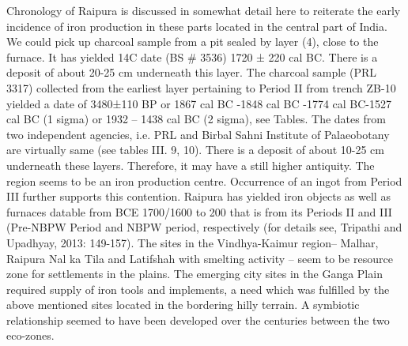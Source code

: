 Chronology of Raipura is discussed in somewhat detail here to reiterate the early incidence of iron production in these parts located in the central part of India. We could pick up charcoal sample from a pit sealed by layer (4), close to the furnace. It has yielded 14C date (BS \# 3536) 1720 ± 220 cal BC. There is a deposit of about 20-25 cm underneath this layer. The charcoal sample (PRL 3317) collected from the earliest layer pertaining to Period II from trench ZB-10 yielded a date of 3480±110 BP or 1867 cal BC -1848 cal BC -1774 cal BC-1527 cal BC (1 sigma) or 1932 – 1438 cal BC (2 sigma), see Tables. The dates from two independent agencies, i.e. PRL and Birbal Sahni Institute of Palaeobotany are virtually same (see tables III. 9, 10). There is a deposit of about 10-25 cm underneath these layers. Therefore, it may have a still higher antiquity. The region seems to be an iron production centre. Occurrence of an ingot from Period III further supports this contention. Raipura has yielded iron objects as well as furnaces datable from BCE 1700/1600 to 200 that is from its Periods II and III (Pre-NBPW Period and NBPW period, respectively (for details see, Tripathi and Upadhyay, 2013: 149-157). The sites in the Vindhya-Kaimur region– Malhar, Raipura Nal ka Tila and Latifshah with smelting activity – seem to be resource zone for settlements in the plains. The emerging city sites in the Ganga Plain required supply of iron tools and implements, a need which was fulfilled by the above mentioned sites located in the bordering hilly terrain. A symbiotic relationship seemed to have been developed over the centuries between the two eco-zones.

